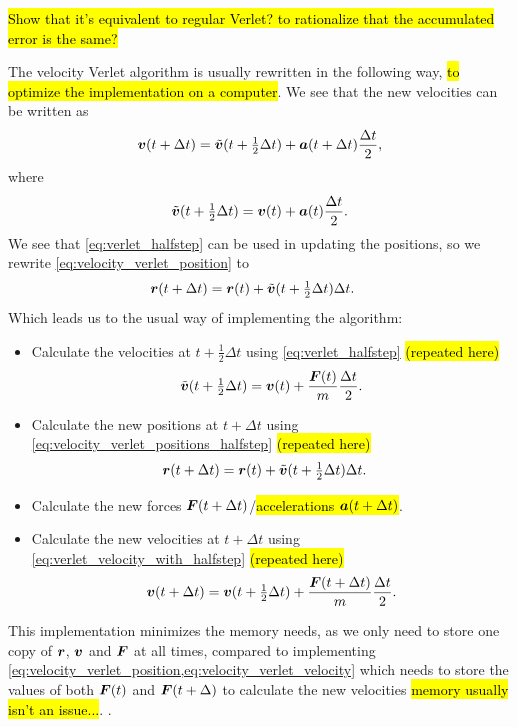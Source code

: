 \hl{Show that it's equivalent to regular Verlet? to rationalize that the accumulated error is the same?}

The velocity Verlet algorithm is usually rewritten in the following way, \hl{to optimize the implementation on a computer}. We see that the new velocities can be written as
\begin{align}
    \boldsymbol{v}(t+\Delta t) = \tilde{\boldsymbol{v}}(t + \tfrac{1}{2}\Delta t) + \boldsymbol{a}(t+\Delta t)\frac{\Delta t}{2}, \label{eq:verlet_velocity_with_halfstep}
\end{align}
where
\begin{align}
    \tilde{\boldsymbol{v}}(t + \tfrac{1}{2}\Delta t) = \boldsymbol{v}(t) + \boldsymbol{a}(t)\frac{\Delta t}{2}.\label{eq:verlet_halfstep}
\end{align}
We see that \cref{eq:verlet_halfstep} can be used in updating the positions, so we rewrite \cref{eq:velocity_verlet_position} to
\begin{align}
    \boldsymbol{r}(t + \Delta t) &= \boldsymbol{r}(t) + \tilde{\boldsymbol{v}}(t+\tfrac{1}{2}\Delta t)\Delta t.\label{eq:velocity_verlet_positions_halfstep}
\end{align}
Which leads us to the usual way of implementing the algorithm\cite{allen1989computer}:
\begin{itemize}
    \item Calculate the velocities at $t+\tfrac{1}{2}\Delta t$ using \cref{eq:verlet_halfstep} \hl{(repeated here)}
    \begin{align*}
        \tilde{\boldsymbol{v}}(t + \tfrac{1}{2}\Delta t) = \boldsymbol{v}(t) + \frac{\boldsymbol{F}(t)}{m}\frac{\Delta t}{2}.
    \end{align*}
    \item Calculate the new positions at $t + \Delta t$ using \cref{eq:velocity_verlet_positions_halfstep} \hl{(repeated here)}
    \begin{align*}
        \boldsymbol{r}(t + \Delta t) &= \boldsymbol{r}(t) + \tilde{\boldsymbol{v}}(t+\tfrac{1}{2}\Delta t)\Delta t.
    \end{align*}
    \item Calculate the new forces $\boldsymbol{F}(t+\Delta t)$/\hl{accelerations $\boldsymbol{a}(t+\Delta t)$}.
    \item Calculate the new velocities at $t+\Delta t$ using \cref{eq:verlet_velocity_with_halfstep} \hl{(repeated here)}
    \begin{align*}
        \boldsymbol{v}(t+\Delta t) = \boldsymbol{v}(t + \tfrac{1}{2}\Delta t) + \frac{\boldsymbol{F}(t + \Delta t)}{m}\frac{\Delta t}{2}.
    \end{align*}
\end{itemize}
This implementation minimizes the memory needs, as we only need to store one copy of $\boldsymbol{r}$, $\boldsymbol{v}$ and $\boldsymbol{F}$ at all times, compared to implementing \cref{eq:velocity_verlet_position,eq:velocity_verlet_velocity} which needs to store the values of both $\boldsymbol{F}(t)$ and $\boldsymbol{F}(t+\Delta)$ to calculate the new velocities \hl{memory usually isn't an issue...}. . 

